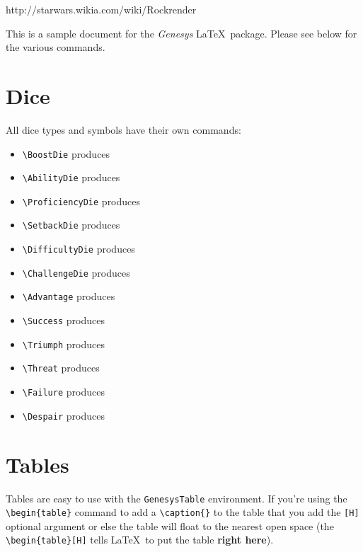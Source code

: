 \documentclass{book}
\begin{document}
http://starwars.wikia.com/wiki/Rockrender



This is a sample document for the \emph{Genesys} \LaTeX\ package. Please see below for the various commands.

\section{Dice}

All dice types and symbols have their own commands:

\begin{multicols}{2}

\begin{itemize}[noitemsep,nolistsep]
\item \verb|\BoostDie| produces \BoostDie
\item \verb|\AbilityDie| produces \AbilityDie
\item \verb|\ProficiencyDie| produces \ProficiencyDie
\item \verb|\SetbackDie| produces \SetbackDie
\item \verb|\DifficultyDie| produces \DifficultyDie
\item \verb|\ChallengeDie| produces \ChallengeDie
\item \verb|\Advantage| produces \Advantage
\item \verb|\Success| produces \Success
\item \verb|\Triumph| produces \Triumph
\item \verb|\Threat| produces \Threat
\item \verb|\Failure| produces \Failure
\item \verb|\Despair| produces \Despair
\end{itemize}

\end{multicols}

\section{Tables}

Tables are easy to use with the \verb|GenesysTable| environment. If you're using the \verb|\begin{table}| command to add a \verb|\caption{}| to the table that you add the \verb|[H]| optional argument or else the table will float to the nearest open space (the \verb|\begin{table}[H]| tells \LaTeX\ to put the table \textbf{right here}).
\end{document}
